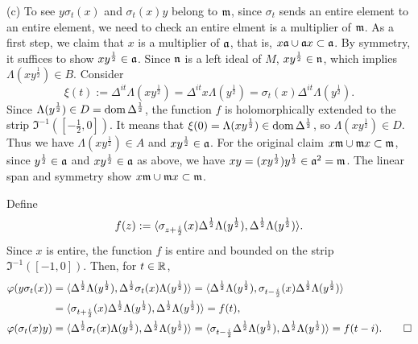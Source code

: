 \documentclass{../../../small}
\begin{document}
\begin{pf}
(c)
To see $y\sigma_t(x)$ and $\sigma_t(x)y$ belong to $\mathfrak{m}$, since $\sigma_t$ sends an entire element to an entire element, we need to check an entire elment is a multiplier of $\mathfrak{m}$.
As a first step, we claim that $x$ is a multiplier of $\mathfrak{a}$, that is, $x\mathfrak{a}\cup\mathfrak{a} x\subset\mathfrak{a}$.
By symmetry, it suffices to show $xy^{\frac12}\in\mathfrak{a}$.
Since $\mathfrak{n}$ is a left ideal of $M$, $xy^{\frac12}\in\mathfrak{n}$, which implies $\Lambda(xy^{\frac12})\in B$.
Consider
\[\xi(t):=\Delta^{it}\Lambda(xy^{\frac12})=\Delta^{it}x\Lambda(y^{\frac12})=\sigma_t(x)\Delta^{it}\Lambda(y^{\frac12}).\]
Since $\Lambda(y^{\frac12})\in D=\operatorname{dom}\Delta^{\frac12}$, the function $f$ is holomorphically extended to the strip $\Im^{-1}([-\frac12,0])$.
It means that $\xi(0)=\Lambda(xy^{\frac12})\in\operatorname{dom}\Delta^{\frac12}$, so $\Lambda(xy^{\frac12})\in D$.
Thus we have $\Lambda(xy^{\frac12})\in A$ and $xy^{\frac12}\in\mathfrak{a}$.
For the original claim $x\mathfrak{m}\cup\mathfrak{m} x\subset\mathfrak{m}$, since $y^{\frac12}\in\mathfrak{a}$ and $xy^{\frac12}\in\mathfrak{a}$ as above, we have $xy=(xy^{\frac12})y^{\frac12}\in\mathfrak{a}^2=\mathfrak{m}$.
The linear span and symmetry show $x\mathfrak{m}\cup\mathfrak{m} x\subset\mathfrak{m}$.

Define
\[f(z):=\langle\sigma_{z+\frac i2}(x)\Delta^{\frac12}\Lambda(y^{\frac12}),\Delta^{\frac12}\Lambda(y^{\frac12})\rangle.\]
Since $x$ is entire, the function $f$ is entire and bounded on the strip $\Im^{-1}([-1,0])$.
Then, for $t\in\mathbb{R}$,
\begin{align*}
\varphi(y\sigma_t(x))
&=\langle\Delta^{\frac12}\Lambda(y^{\frac12}),\Delta^{\frac12}\sigma_t(x)\Lambda(y^\frac12)\rangle
=\langle\Delta^{\frac12}\Lambda(y^{\frac12}),\sigma_{t-\frac i2}(x)\Delta^{\frac12}\Lambda(y^\frac12)\rangle\\
&=\langle\sigma_{t+\frac i2}(x)\Delta^{\frac12}\Lambda(y^{\frac12}),\Delta^{\frac12}\Lambda(y^\frac12)\rangle=f(t),\\
\varphi(\sigma_t(x)y)
&=\langle\Delta^{\frac12}\sigma_t(x)\Lambda(y^{\frac12}),\Delta^{\frac12}\Lambda(y^\frac12)\rangle
=\langle\sigma_{t-\frac i2}\Delta^{\frac12}\Lambda(y^{\frac12}),\Delta^{\frac12}\Lambda(y^\frac12)\rangle=f(t-i).\qedhere
\end{align*}
\end{pf}
\end{document}
